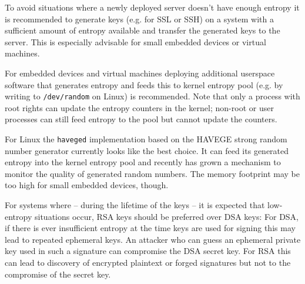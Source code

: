 To avoid situations where a newly deployed server doesn't have enough
entropy it is recommended to generate keys (e.g. for SSL or SSH) on
a system with a sufficient amount of entropy available and transfer the generated keys
to the server.  This is especially advisable for small embedded devices
or virtual machines.

For embedded devices and virtual machines deploying additional userspace
software that generates entropy and feeds this to kernel entropy pool
(e.g. by writing to \verb+/dev/random+ on Linux) is recommended. Note
that only a process with root rights can update the entropy counters in the
kernel; non-root or user processes can still feed entropy to the pool but
cannot update the counters\cite{Wikipedia:/dev/random}.

For Linux the \verb+haveged+
implementation\cite{HAV13a} based on the HAVEGE\cite{SS03}
strong random number generator currently looks like the best choice. It
can feed its generated entropy into the kernel entropy pool and recently
has grown a mechanism to monitor the quality of generated random
numbers\cite{HAV13b}. The memory footprint may be too high for small
embedded devices, though.

For systems where -- during the lifetime of the keys -- it is expected
that low-entropy situations occur, RSA keys should be preferred over DSA
keys: For DSA, if there is ever insufficient entropy at the time keys
are used for signing this may lead to repeated ephemeral keys. An
attacker who can guess an ephemeral private key used in such a signature
can compromise the DSA secret key.
For RSA this can lead to discovery of encrypted plaintext or forged
signatures but not to the compromise of the secret key\cite{HDWH12}.
